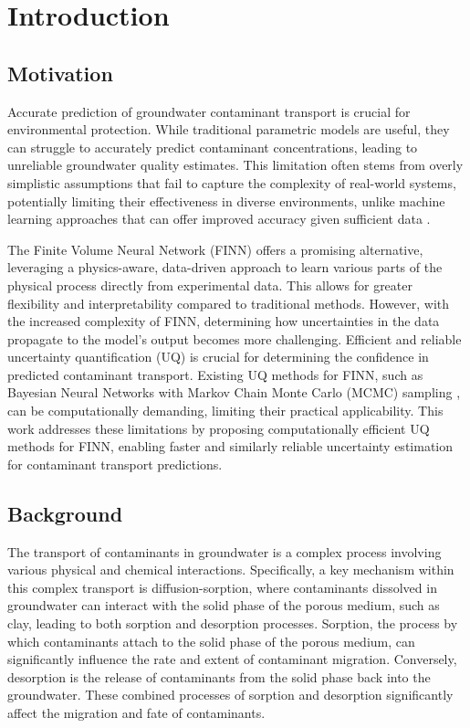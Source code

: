 \chapter{Introduction}

\section{Motivation}
Accurate prediction of groundwater contaminant transport is crucial for environmental protection. While traditional parametric models are useful, they can struggle to accurately predict contaminant concentrations, leading to unreliable groundwater quality estimates. This limitation often stems from overly simplistic assumptions that fail to capture the complexity of real-world systems, potentially limiting their effectiveness in diverse environments, unlike machine learning approaches that can offer improved accuracy given sufficient data \cite{finn}.

The Finite Volume Neural Network (FINN) \cite{finn} offers a promising alternative, leveraging a physics-aware, data-driven approach to learn various parts of the physical process directly from experimental data. This allows for greater flexibility and interpretability compared to traditional methods. However, with the increased complexity of FINN, determining how uncertainties in the data propagate to the model's output becomes more challenging. Efficient and reliable uncertainty quantification (UQ) is crucial for determining the confidence in predicted contaminant transport. Existing UQ methods for FINN, such as Bayesian Neural Networks with Markov Chain Monte Carlo (MCMC) sampling \cite{bardenet2017markov}, can be computationally demanding, limiting their practical applicability. This work addresses these limitations by proposing computationally efficient UQ methods for FINN, enabling faster and similarly reliable uncertainty estimation for contaminant transport predictions.


\section{Background}
The transport of contaminants in groundwater is a complex process involving various physical and chemical interactions. Specifically, a key mechanism within this complex transport is diffusion-sorption, where contaminants dissolved in groundwater can interact with the solid phase of the porous medium, such as clay, leading to both sorption and desorption processes. Sorption, the process by which contaminants attach to the solid phase of the porous medium, can significantly influence the rate and extent of contaminant migration. Conversely, desorption is the release of contaminants from the solid phase back into the groundwater. These combined processes of sorption and desorption significantly affect the migration and fate of contaminants.

